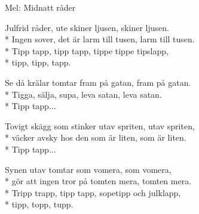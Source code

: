 \begin{SongText}
    \begin{SongVerse}
        Mel: Midnatt råder
    \end{SongVerse}
    \begin{SongVerse}
        Julfrid råder, ute skiner ljusen, skiner ljusen.\\*%
        Ingen sover, det är larm till tusen, larm till tusen.\\*%
        Tipp tapp, tipp tapp, tippe tippe tipslapp,\\*%
        tipp, tipp, tapp.
    \end{SongVerse}
    \begin{SongVerse}
        Se då krälar tomtar fram på gatan, fram på gatan.\\*%
        Tigga, sälja, supa, leva satan, leva satan.\\*%
        Tipp tapp...
    \end{SongVerse}
    \begin{SongVerse}
        Tovigt skägg som stinker utav spriten, utav spriten,\\*%
        väcker avsky hos den som är liten, som är liten.\\*%
        Tipp tapp...
    \end{SongVerse}
    \begin{SongVerse}
        Synen utav tomtar som vomera, som vomera,\\*%
        gör att ingen tror på tomten mera, tomten mera.\\*%
        Tripp trapp, tipp tapp, sopetipp och julklapp,\\*%
        tipp, topp, tupp.
    \end{SongVerse}
    \begin{SongVerse}
    \end{SongVerse}
\end{SongText}
